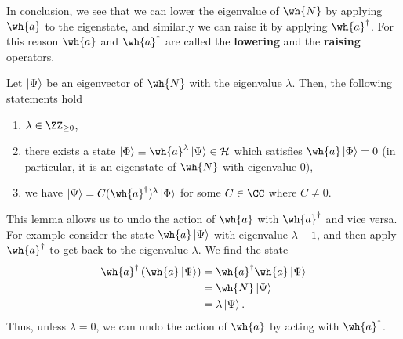 \documentclass[12pt, a4paper]{article}
\begin{document}
\begin{mdnote}
    In conclusion, we see that we can lower the eigenvalue of \(\wh{N}\) by applying \(\wh{a}\) to the eigenstate, and similarly we can raise it by applying \(\wh{a}^{\dagger}\). For this reason \(\wh{a}\) and \(\wh{a}^{\dagger}\) are called the \textbf{lowering} and the \textbf{raising} operators. 
\end{mdnote}

\begin{mdlemma}
    Let \(\ket{\Psi}\) be an eigenvector of \(\wh{N}\) with the eigenvalue \(\lambda\). Then, the following statements hold 
    \begin{enumerate}
        \item \(\lambda \in \ZZ_{\geq 0}\),
        \item there exists a state \(\ket{\Phi} \equiv \wh{a}^{\lambda}\ket{\Psi} \in \mathcal{H}\) which satisfies \(\wh{a}\ket{\Phi}=0\) (in particular, it is an eigenstate of \(\wh{N}\) with eigenvalue \(0\)),
        \item we have \(\ket{\Psi} = C (\wh{a}^{\dagger})^{\lambda}\ket{\Phi}\) for some \(C \in \CC\) where \(C \neq 0\).
    \end{enumerate}
\end{mdlemma}

\begin{mdnote}
    This lemma allows us to undo the action of \(\wh{a}\) with \(\wh{a}^{\dagger}\) and vice versa. For example consider the state \(\wh{a}\ket{\Psi}\) with eigenvalue \(\lambda-1\), and then apply \(\wh{a}^{\dagger}\) to get back to the eigenvalue \(\lambda\). We find the state 
    \[\begin{aligned}
        \wh{a}^{\dagger} \left( \wh{a}\ket{\Psi} \right) &= \wh{a}^{\dagger}\wh{a}\ket{\Psi} \\
        &= \wh{N} \ket{\Psi} \\
        &= \lambda \ket{\Psi}.
    \end{aligned}\]
    Thus, unless \(\lambda=0\), we can undo the action of \(\wh{a}\) by acting with \(\wh{a}^{\dagger}\).
\end{mdnote}
\end{document}
